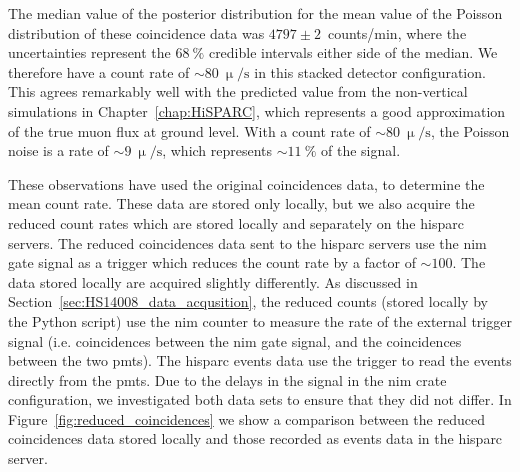 %
%


The median value of the posterior distribution for the mean value of the Poisson distribution of these coincidence data was $4797\pm2$~counts/min, where the uncertainties represent the $68~\%$ credible intervals either side of the median. We therefore have a count rate of $\sim80~\upmu/\mathrm{s}$ in this stacked detector configuration. This agrees remarkably well with the predicted value from the non-vertical simulations in Chapter~\ref{chap:HiSPARC}, which represents a good approximation of the true muon flux at ground level. With a count rate of $\sim80~\upmu/\mathrm{s}$, the Poisson noise is a rate of $\sim9~\upmu/\mathrm{s}$, which represents $\sim11~\%$ of the signal.


These observations have used the original coincidences data, to determine the mean count rate. These data are stored only locally, but we also acquire the reduced count rates which are stored locally and separately on the \gls{hisparc} servers. The reduced coincidences data sent to the \gls{hisparc} servers use the \gls{nim} gate signal as a trigger which reduces the count rate by a factor of $\sim 100$. The data stored locally are acquired slightly differently. As discussed in Section~\ref{sec:HS14008_data_acqusition}, the reduced counts (stored locally by the Python script) use the \gls{nim} counter to measure the rate of the external trigger signal (i.e. coincidences between the \gls{nim} gate signal, and the coincidences between the two \glspl{pmt}). The \gls{hisparc} events data use the trigger to read the events directly from the \glspl{pmt}. Due to the delays in the signal in the \gls{nim} crate configuration, we investigated both data sets to ensure that they did not differ. In Figure~\ref{fig:reduced_coincidences} we show a comparison between the reduced coincidences data stored locally and those recorded as events data in the \gls{hisparc} server.


